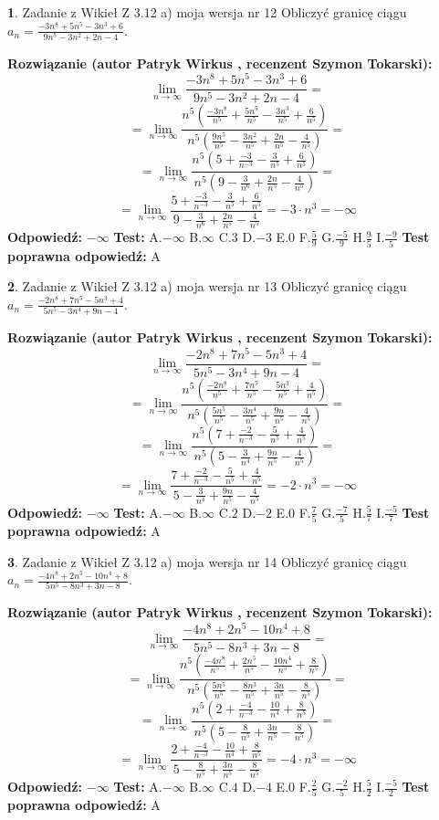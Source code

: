 \documentclass[12pt, a4paper]{article}
\theoremstyle{definition} %
\newtheorem{zad}{}
\newcommand{\zadStart}[1]{\begin{zad}#1\newline}
\newcommand{\zadStop}{\end{zad}}
\newcommand{\rozwStart}[2]{\noindent \textbf{Rozwiązanie (autor #1 , recenzent #2): }\newline}
\newcommand{\rozwStop}{\newline}
\newcommand{\odpStart}{\noindent \textbf{Odpowiedź:}\newline}
\newcommand{\odpStop}{\newline}
\newcommand{\testStart}{\noindent \textbf{Test:}\newline}
\newcommand{\testStop}{\newline}
\newcommand{\kluczStart}{\noindent \textbf{Test poprawna odpowiedź:}\newline}
\newcommand{\kluczStop}{\newline}
\begin{document}
\zadStart{Zadanie z Wikieł Z 3.12 a) moja wersja nr 12}
Obliczyć granicę ciągu $a_{n}=\frac{-3n^{8}+5n^{5}-3n^{3}+6}{9n^{5}-3n^{2}+2n-4}$.
\zadStop
\rozwStart{Patryk Wirkus}{Szymon Tokarski}
$$\lim\limits_{n\to\infty}\frac{-3n^{8}+5n^{5}-3n^{3}+6}{9n^{5}-3n^{2}+2n-4}=$$
$$=\lim\limits_{n\to\infty}\frac{n^{5}\left(\frac{-3n^{8}}{n^{5}}+\frac{5n^{5}}{n^{5}}-\frac{3n^{3}}{n^{5}}+\frac{6}{n^{5}}\right)}{n^{5}\left(\frac{9n^{5}}{n^{5}}-\frac{3n^{2}}{n^{5}}+\frac{2n}{n^{5}}-\frac{4}{n^{5}}\right)}=$$
$$=\lim\limits_{n\to\infty}\frac{n^{5}\left(5+\frac{-3}{n^{-3}}-\frac{3}{n^{5}}+\frac{6}{n^{5}}\right)}
{n^{5}\left(9-\frac{3}{n^{6}}+\frac{2n}{n^{5}}-\frac{4}{n^{5}}\right)}=$$
$$=\lim\limits_{n\to\infty}\frac{5+\frac{-3}{n^{-3}}-\frac{3}{n^{5}}+\frac{6}{n^{5}}}{9-\frac{3}{n^{6}}+\frac{2n}{n^{5}}-\frac{4}{n^{5}}}=-3\cdot n^{3} = -\infty$$
\rozwStop
\odpStart
$-\infty$
\odpStop
\testStart
A.$-\infty$
B.$\infty$
C.$3$
D.$-3$
E.$0$
F.$\frac{5}{9}$
G.$\frac{-5}{9}$
H.$\frac{9}{5}$
I.$\frac{-9}{5}$
\testStop
\kluczStart
A
\kluczStop



\zadStart{Zadanie z Wikieł Z 3.12 a) moja wersja nr 13}
Obliczyć granicę ciągu $a_{n}=\frac{-2n^{8}+7n^{5}-5n^{3}+4}{5n^{5}-3n^{4}+9n-4}$.
\zadStop
\rozwStart{Patryk Wirkus}{Szymon Tokarski}
$$\lim\limits_{n\to\infty}\frac{-2n^{8}+7n^{5}-5n^{3}+4}{5n^{5}-3n^{4}+9n-4}=$$
$$=\lim\limits_{n\to\infty}\frac{n^{5}\left(\frac{-2n^{8}}{n^{5}}+\frac{7n^{5}}{n^{5}}-\frac{5n^{3}}{n^{5}}+\frac{4}{n^{5}}\right)}{n^{5}\left(\frac{5n^{5}}{n^{5}}-\frac{3n^{4}}{n^{5}}+\frac{9n}{n^{5}}-\frac{4}{n^{5}}\right)}=$$
$$=\lim\limits_{n\to\infty}\frac{n^{5}\left(7+\frac{-2}{n^{-3}}-\frac{5}{n^{5}}+\frac{4}{n^{5}}\right)}
{n^{5}\left(5-\frac{3}{n^{4}}+\frac{9n}{n^{5}}-\frac{4}{n^{5}}\right)}=$$
$$=\lim\limits_{n\to\infty}\frac{7+\frac{-2}{n^{-3}}-\frac{5}{n^{5}}+\frac{4}{n^{5}}}{5-\frac{3}{n^{4}}+\frac{9n}{n^{5}}-\frac{4}{n^{5}}}=-2\cdot n^{3} = -\infty$$
\rozwStop
\odpStart
$-\infty$
\odpStop
\testStart
A.$-\infty$
B.$\infty$
C.$2$
D.$-2$
E.$0$
F.$\frac{7}{5}$
G.$\frac{-7}{5}$
H.$\frac{5}{7}$
I.$\frac{-5}{7}$
\testStop
\kluczStart
A
\kluczStop



\zadStart{Zadanie z Wikieł Z 3.12 a) moja wersja nr 14}
Obliczyć granicę ciągu $a_{n}=\frac{-4n^{8}+2n^{5}-10n^{4}+8}{5n^{5}-8n^{3}+3n-8}$.
\zadStop
\rozwStart{Patryk Wirkus}{Szymon Tokarski}
$$\lim\limits_{n\to\infty}\frac{-4n^{8}+2n^{5}-10n^{4}+8}{5n^{5}-8n^{3}+3n-8}=$$
$$=\lim\limits_{n\to\infty}\frac{n^{5}\left(\frac{-4n^{8}}{n^{5}}+\frac{2n^{5}}{n^{5}}-\frac{10n^{4}}{n^{5}}+\frac{8}{n^{5}}\right)}{n^{5}\left(\frac{5n^{5}}{n^{5}}-\frac{8n^{3}}{n^{5}}+\frac{3n}{n^{5}}-\frac{8}{n^{5}}\right)}=$$
$$=\lim\limits_{n\to\infty}\frac{n^{5}\left(2+\frac{-4}{n^{-3}}-\frac{10}{n^{4}}+\frac{8}{n^{5}}\right)}
{n^{5}\left(5-\frac{8}{n^{5}}+\frac{3n}{n^{5}}-\frac{8}{n^{5}}\right)}=$$
$$=\lim\limits_{n\to\infty}\frac{2+\frac{-4}{n^{-3}}-\frac{10}{n^{4}}+\frac{8}{n^{5}}}{5-\frac{8}{n^{5}}+\frac{3n}{n^{5}}-\frac{8}{n^{5}}}=-4\cdot n^{3} = -\infty$$
\rozwStop
\odpStart
$-\infty$
\odpStop
\testStart
A.$-\infty$
B.$\infty$
C.$4$
D.$-4$
E.$0$
F.$\frac{2}{5}$
G.$\frac{-2}{5}$
H.$\frac{5}{2}$
I.$\frac{-5}{2}$
\testStop
\kluczStart
A
\kluczStop
\end{document}
